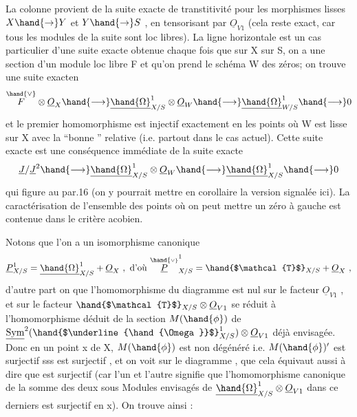 
La colonne provient de la suite exacte de transtitivité pour les
morphismes lisses $X\hand{\to} Y$ et $Y\hand{\to} S$ , en  tensorisant par $\underline{O}_{V1}$ (cela reste
exact, car tous les modules de la suite sont loc libres). La ligne
horizontale est un cas particulier d'une suite exacte obtenue chaque
fois que sur X  sur S, on a une section \hand{$\mu$} d'un module loc libre F
et qu'on prend le schéma W des zéros; on trouve une suite exacten
\[ \overset{\hand{\vee}}{F}\otimes \underline{O}_X \hand{\longrightarrow} \underline{\hand{\Omega}}^1_{X/S}\otimes \underline{O}_W \hand{\longrightarrow} \underline{\hand{\Omega}}^1_{W/S} \hand{\longrightarrow} 0 \]
et  le premier homomorphisme est injectif exactement en les points où
W est lisse sur X avec la ``bonne ''  relative (i.e. partout dans
le cas actuel).  Cette suite exacte est 
  une
conséquence immédiate de la suite exacte
\[ \underline{J}/\underline{J}^2\hand{\longrightarrow} \underline{\hand{\Omega}}^1_{X/S}\otimes \underline{O}_W \hand{\longrightarrow} \underline{\hand{\Omega}}^1_{X/S} \hand{\longrightarrow} 0 \]
\margin{16 \textbar} qui figure au par.16 (on y pourrait mettre en corollaire la version
signalée ici). La caractérisation de l'ensemble des points où on
peut mettre un zéro à gauche est contenue dans le critère acobien.

Notons que l'on a un isomorphisme canonique
\[ \underline{P}^1_{X/S} = \underline{\hand{\Omega}}^1_{X/S} + \underline{O}_X \ ,\ \text{d'où}\ \overset{\hand{\scriptscriptstyle\vee}}{\underline{P}}^1_{X/S} = \hand{$\mathcal{T}$}_{X/S} + \underline{O}_X \ , \]
d'autre part on  que l'homomorphisme  \hand{$\mu$} du diagramme  est nul
sur le facteur $\underline{O}_{V1}$ , et sur le facteur $\hand{$\mathcal{T}$}_{X/S}\otimes\underline{O}_{V1}$  se réduit à
l'homomorphisme  déduit de la section $M(\hand{\phi})$ de $\underline{\mathrm{Sym}}^2(\hand{$\underline{\hand{\Omega}}$}^1_{X/S})\otimes \underline{O}_{V1}$ déjà
envisagée. Donc en un point x de X, $M(\hand{\phi})$ est non dégénéré i.e. $M(\hand{\phi})'$
est surjectif sss \hand{$\mu$} est surjectif , et on voit sur le diagramme ,
que cela équivaut aussi à dire que \hand{$\nu$} est surjectif  (car l'un et l'autre
signifie que l'homomorphisme canonique de la somme des deux sous
Modules envisagés de $\underline{\hand{\Omega}}^1_{X/S}\otimes \underline{O}_{V1}$ dans ce derniers est surjectif en
x). On trouve ainsi :

